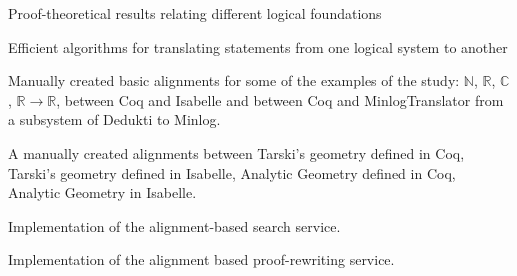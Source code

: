 \begin{workpackage}
\begin{wpdelivs}
  \begin{wpdeliv}[due=24,miles=startup,id=prooftheoretical,dissem=PU,nature=DEM,lead=Lee]
    {Proof-theoretical results relating different logical foundations}
  \end{wpdeliv}
  \begin{wpdeliv}[due=42,miles=startup,id=translatingstatements,dissem=PU,nature=DEM,lead=Lee]
    {Efficient algorithms for translating statements from one logical system to another}
  \end{wpdeliv}
  \begin{wpdeliv}[due=24,miles=startup,id=aligningnumbers,dissem=PU,nature=DEM,lead=Str]
    {Manually created basic alignments for some of the examples of the
      study: $\mathbb{N}$, $\mathbb{R}$, $\mathbb{C}$, $\mathbb{R}
      \rightarrow \mathbb{R}$, between Coq and Isabelle and between
      Coq and MinlogTranslator from a subsystem of Dedukti to
      Minlog.}
  \end{wpdeliv}
  \begin{wpdeliv}[due=36,miles=startup,id=aligninggeometries,dissem=PU,nature=DEM,lead=Bel]
    {A manually created alignments between Tarski's geometry defined
      in Coq, Tarski's geometry defined in Isabelle, Analytic Geometry
      defined in Coq, Analytic Geometry in Isabelle.}
  \end{wpdeliv}
  \begin{wpdeliv}[due=36,miles=???,id=alignsearch,dissem=PU,nature=DEM,lead=Fau]
    {Implementation of the alignment-based search service.}
  \end{wpdeliv}
	
  \begin{wpdeliv}[due=36,miles=???,id=alignproofrewr,dissem=PU,nature=DEM,lead=Bol]
    {Implementation of the alignment based proof-rewriting service.}
  \end{wpdeliv}

\end{wpdelivs}
\end{workpackage}

